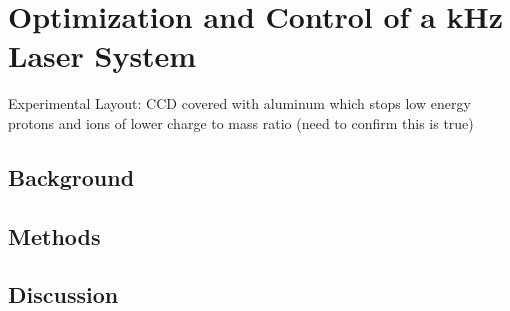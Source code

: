 \chapter{Optimization and Control of a kHz Laser System} \label{ch:6}

Experimental Layout: CCD covered with aluminum which stops low energy protons and ions of lower charge to mass ratio (need to confirm this is true)

\section{Background}

\section{Methods}

\section{Discussion}